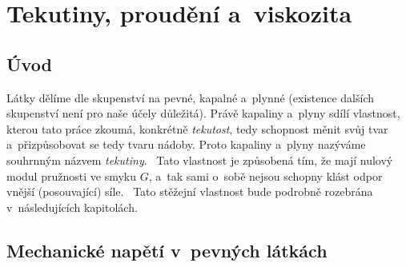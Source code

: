 \documentclass[12pt]{article}
\begin{document}
\newpage%
\section{Tekutiny, proudění a~viskozita}%

\subsection{Úvod}%

Látky dělíme dle skupenství na pevné, kapalné a~plynné (existence dalších skupenství není pro naše účely důležitá). Právě kapaliny a~plyny sdílí vlastnost, kterou tato práce zkoumá, konkrétně \emph{tekutost}, tedy schopnost měnit svůj tvar a~přizpůsobovat se tedy tvaru nádoby. Proto kapaliny a~plyny nazýváme souhrnným názvem \emph{tekutiny}.~\cite{wiki:Tekutina} Tato vlastnost je způsobená tím, že mají nulový modul pružnosti ve smyku $G$, a~tak sami o~sobě nejsou schopny klást odpor vnější (posouvající) síle.~\cite{wiki:Fluid} Tato stěžejní vlastnost bude podrobně rozebrána v~následujících kapitolách.

\subsection{Mechanické napětí v~pevných látkách}%
\end{document}
